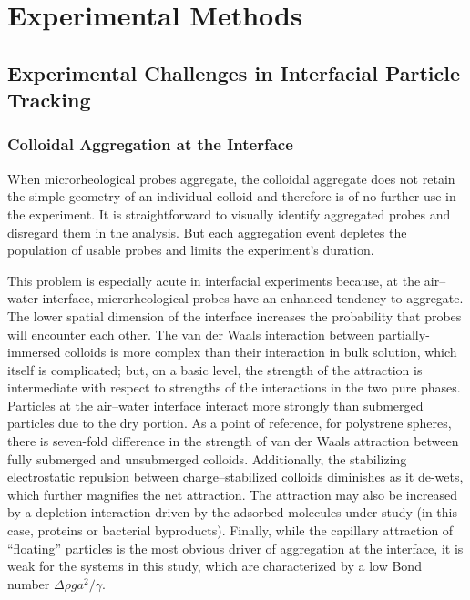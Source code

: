 \chapter{\label{chap:methods}Experimental Methods}

\section{Experimental Challenges in Interfacial Particle Tracking}

\subsection{Colloidal Aggregation at the Interface}

When microrheological probes aggregate, the colloidal aggregate does not retain the simple geometry of an individual colloid and therefore is of no further use in the experiment. It is straightforward to visually identify aggregated probes and disregard them in the analysis. But each aggregation event depletes the population of usable probes and limits the experiment's duration.

This problem is especially acute in interfacial experiments because, at the air--water interface, microrheological probes have an enhanced tendency to aggregate. The lower spatial dimension of the interface increases the probability that probes will encounter each other. The van der Waals interaction between partially-immersed colloids is more complex than their interaction in bulk solution, which itself is complicated\cite{Crocker1994}; but, on a basic level, the strength of the attraction is intermediate with respect to strengths of the interactions in the two pure phases. Particles at the air--water interface interact more strongly than submerged particles due to the dry portion. As a point of reference, for polystrene spheres, there is seven-fold difference in the strength of van der Waals attraction between fully submerged and unsubmerged colloids\cite{Williams1991}. Additionally, the stabilizing electrostatic repulsion between charge--stabilized colloids diminishes as it de-wets, which further magnifies the net attraction\cite{Williams1991,Lyne1989}. The attraction may also be increased by a depletion interaction driven by the adsorbed molecules under study (in this case, proteins or bacterial byproducts). Finally, while the capillary attraction of ``floating'' particles is the most obvious driver of aggregation at the interface, it is weak for the systems in this study, which are characterized by a low Bond number $\Delta\rho ga^2/\gamma$.

